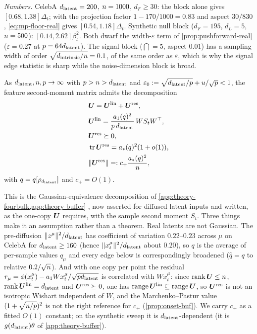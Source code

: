\emph{Numbers.} CelebA $d_{\mathrm{latent}}=200$, $n=1000$, $d_F\ge30$: the block alone gives $[0.68,1.38]\Delta_t$; with the projection factor $1-170/1000=0.83$ and aspect $30/830$, \eqref{eq:mp-floor-real} gives $[0.54,1.18]\Delta_t$. Synthetic null block ($d_F=195$, $d_L=5$, $n=500$): $[0.14,2.62]\beta_t^2$. Both dwarf the width-$\varepsilon$ term of \cref{prop:pushforward-real} ($\varepsilon=0.27$ at $p=64d_{\mathrm{latent}}$). The signal block ($\dint=5$, aspect $0.01$) has a sampling width of order $\sqrt{d_{\mathrm{intrinsic}}/n}=0.1$, of the same order as $\varepsilon$, which is why the signal edge statistic is sharp while the noise-dimension block is broad.

\begin{assumption}\label{assump:gep-real}
As $d_{\mathrm{latent}},n,p\to\infty$ with $p>n>d_{\mathrm{latent}}$ and $\varepsilon_0:=\sqrt{d_{\mathrm{latent}}/p}+u/\sqrt{p}<1$, the feature second-moment matrix admits the decomposition
\begin{equation}\label{eq:Usplit-real}
\begin{aligned}
&\bm{U}=\bm{U}^{\mathrm{lin}}+\bm{U}^{\mathrm{res}},\\ &
\bm{U}^{\mathrm{lin}}=\frac{a_1(q)^2}{p\,d_{\mathrm{latent}}}\,WS_tW^\top,\\ & \bm{U}^{\mathrm{res}}\succeq0,\\ &
\operatorname{tr}\bm{U}^{\mathrm{res}}=a_\ast(q)^2(1+o(1)),\\ & \|\bm{U}^{\mathrm{res}}\|=:c_+\frac{a_\ast(q)^2}{n},
\end{aligned}
\end{equation}
with $q=q[\rho_{d_{\mathrm{latent}}}]$ and $c_+=O(1)$.
\end{assumption}
This is the Gaussian-equivalence decomposition of \cref{app:theory-fourbulk,app:theory-buffer} \citep{bonnaire2025,goldt2022gaussian,hu2022universality,mei2022generalization}, now asserted for diffused latent inputs and written, as the one-copy $\bm{U}$ requires, with the sample second moment $S_t$. Three things make it an assumption rather than a theorem. Real latents are not Gaussian. The pre-diffusion $\|z^\mu\|^2/d_{\mathrm{latent}}$ has coefficient of variation $0.22$--$0.23$ across $\mu$ on CelebA for $d_{\mathrm{latent}}\ge160$ (hence $\|x_t^\mu\|^2/d_{\mathrm{latent}}$ about $0.20$), so $q$ is the average of per-sample values $q_\mu$ and every edge below is correspondingly broadened ($\hat q=q$ to relative $0.2/\sqrt{n}$). And with one copy per point the residual $r_\mu=\phi(x_t^\mu)-a_1Wx_t^\mu/\sqrt{pd_{\mathrm{latent}}}$ is correlated with $Wx_t^\mu$: since $\operatorname{rank}\bm{U}\le n$, $\operatorname{rank}\bm{U}^{\mathrm{lin}}=d_{\mathrm{latent}}$ and $\bm{U}^{\mathrm{res}}\succeq0$, one has $\operatorname{range}\bm{U}^{\mathrm{lin}}\subseteq\operatorname{range}\bm{U}$, so $\bm{U}^{\mathrm{res}}$ is not an isotropic Wishart independent of $W$, and the Marchenko--Pastur value $(1+\sqrt{n/p})^2$ is not the right reference for $c_+$ (\cref{prop:onset-buf}). We carry $c_+$ as a fitted $O(1)$ constant; on the synthetic sweep it is $d_{\mathrm{latent}}$-dependent (it is $g(d_{\mathrm{latent}})\theta$ of \cref{app:theory-buffer}).

